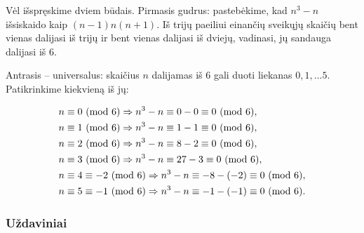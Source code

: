\begin{sprendimas}
Vėl išspręskime dviem būdais. Pirmasis gudrus: pastebėkime, kad $n^3-n$
išsiskaido kaip $(n-1)n(n+1)$.  Iš trijų paeiliui einančių sveikųjų skaičių
bent vienas dalijasi iš trijų ir bent vienas dalijasi iš dviejų, vadinasi,
jų sandauga dalijasi iš $6$.

Antrasis -- universalus: skaičius $n$ dalijamas iš $6$ gali duoti liekanas
$0,1,\dots 5$. Patikrinkime kiekvieną iš jų:

\begin{align*} 
  n&\equiv 0 \ (\text{mod } 6) \Rightarrow n^3 - n \equiv 0-0 \equiv 0 \ (\text{mod } 6),\\ 
  n&\equiv 1 \ (\text{mod } 6) \Rightarrow n^3 - n \equiv 1-1 \equiv 0 \ (\text{mod } 6),\\
  n&\equiv 2 \ (\text{mod } 6) \Rightarrow n^3 - n \equiv 8-2 \equiv 0 \ (\text{mod } 6),\\ 
  n&\equiv 3 \ (\text{mod } 6) \Rightarrow n^3 - n \equiv 27-3 \equiv 0 \ (\text{mod } 6),\\ 
  n&\equiv 4 \equiv -2 \ (\text{mod } 6) \Rightarrow n^3 - n \equiv -8-(-2) \equiv 0
  \ (\text{mod } 6),\\
  n&\equiv 5 \equiv -1 \ (\text{mod } 6) \Rightarrow n^3 - n \equiv -1-(-1) \equiv 0
  \ (\text{mod } 6).\\ 
\end{align*}
\end{sprendimas}

\subsubsection{Uždaviniai} 

